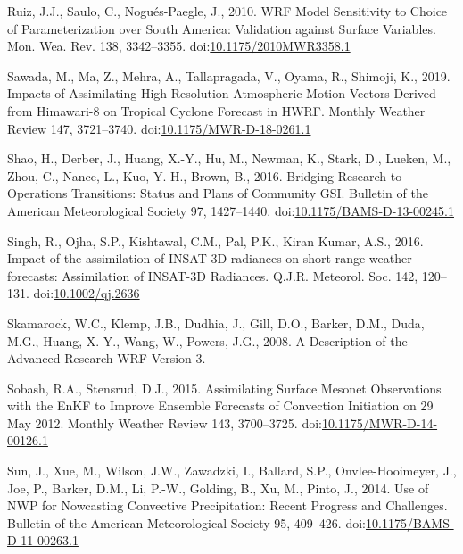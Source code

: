 \documentclass[final,5p,times,twocolumn,authoryear]{elsarticle} %
\begin{document}
\leavevmode\hypertarget{ref-ruiz2010}{}%
Ruiz, J.J., Saulo, C., Nogués-Paegle, J., 2010. WRF Model Sensitivity to Choice of Parameterization over South America: Validation against Surface Variables. Mon. Wea. Rev. 138, 3342--3355. doi:\href{https://doi.org/10.1175/2010MWR3358.1}{10.1175/2010MWR3358.1}

\leavevmode\hypertarget{ref-sawada2019}{}%
Sawada, M., Ma, Z., Mehra, A., Tallapragada, V., Oyama, R., Shimoji, K., 2019. Impacts of Assimilating High-Resolution Atmospheric Motion Vectors Derived from Himawari-8 on Tropical Cyclone Forecast in HWRF. Monthly Weather Review 147, 3721--3740. doi:\href{https://doi.org/10.1175/MWR-D-18-0261.1}{10.1175/MWR-D-18-0261.1}

\leavevmode\hypertarget{ref-shao2016}{}%
Shao, H., Derber, J., Huang, X.-Y., Hu, M., Newman, K., Stark, D., Lueken, M., Zhou, C., Nance, L., Kuo, Y.-H., Brown, B., 2016. Bridging Research to Operations Transitions: Status and Plans of Community GSI. Bulletin of the American Meteorological Society 97, 1427--1440. doi:\href{https://doi.org/10.1175/BAMS-D-13-00245.1}{10.1175/BAMS-D-13-00245.1}

\leavevmode\hypertarget{ref-singh2016}{}%
Singh, R., Ojha, S.P., Kishtawal, C.M., Pal, P.K., Kiran Kumar, A.S., 2016. Impact of the assimilation of INSAT-3D radiances on short-range weather forecasts: Assimilation of INSAT-3D Radiances. Q.J.R. Meteorol. Soc. 142, 120--131. doi:\href{https://doi.org/10.1002/qj.2636}{10.1002/qj.2636}

\leavevmode\hypertarget{ref-skamarock2008}{}%
Skamarock, W.C., Klemp, J.B., Dudhia, J., Gill, D.O., Barker, D.M., Duda, M.G., Huang, X.-Y., Wang, W., Powers, J.G., 2008. A Description of the Advanced Research WRF Version 3.

\leavevmode\hypertarget{ref-sobash2015}{}%
Sobash, R.A., Stensrud, D.J., 2015. Assimilating Surface Mesonet Observations with the EnKF to Improve Ensemble Forecasts of Convection Initiation on 29 May 2012. Monthly Weather Review 143, 3700--3725. doi:\href{https://doi.org/10.1175/MWR-D-14-00126.1}{10.1175/MWR-D-14-00126.1}

\leavevmode\hypertarget{ref-sun2014}{}%
Sun, J., Xue, M., Wilson, J.W., Zawadzki, I., Ballard, S.P., Onvlee-Hooimeyer, J., Joe, P., Barker, D.M., Li, P.-W., Golding, B., Xu, M., Pinto, J., 2014. Use of NWP for Nowcasting Convective Precipitation: Recent Progress and Challenges. Bulletin of the American Meteorological Society 95, 409--426. doi:\href{https://doi.org/10.1175/BAMS-D-11-00263.1}{10.1175/BAMS-D-11-00263.1}
\end{document}
